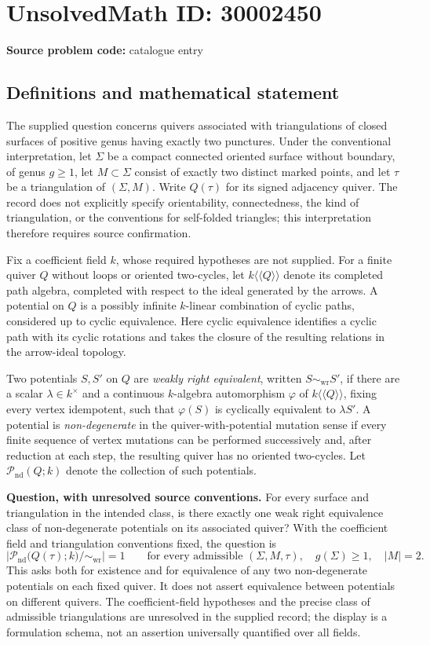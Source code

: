 \documentclass[11pt]{article}
\begin{document}
\section*{UnsolvedMath ID: 30002450}
\textbf{Source problem code:} catalogue entry
\subsection{Definitions and mathematical statement}
The supplied question concerns quivers associated with triangulations of closed surfaces of positive genus having exactly two punctures. Under the conventional interpretation, let \(\Sigma\) be a compact connected oriented surface without boundary, of genus \(g\geq 1\), let \(M\subset\Sigma\) consist of exactly two distinct marked points, and let \(\tau\) be a triangulation of \((\Sigma,M)\). Write \(Q(\tau)\) for its signed adjacency quiver. The record does not explicitly specify orientability, connectedness, the kind of triangulation, or the conventions for self-folded triangles; this interpretation therefore requires source confirmation.

Fix a coefficient field \(k\), whose required hypotheses are not supplied. For a finite quiver \(Q\) without loops or oriented two-cycles, let \(k\langle\!\langle Q\rangle\!\rangle\) denote its completed path algebra, completed with respect to the ideal generated by the arrows. A potential on \(Q\) is a possibly infinite \(k\)-linear combination of cyclic paths, considered up to cyclic equivalence. Here cyclic equivalence identifies a cyclic path with its cyclic rotations and takes the closure of the resulting relations in the arrow-ideal topology.

Two potentials \(S,S'\) on \(Q\) are \emph{weakly right equivalent}, written \(S\sim_{\mathrm{wr}}S'\), if there are a scalar \(\lambda\in k^{\times}\) and a continuous \(k\)-algebra automorphism \(\varphi\) of \(k\langle\!\langle Q\rangle\!\rangle\), fixing every vertex idempotent, such that \(\varphi(S)\) is cyclically equivalent to \(\lambda S'\). A potential is \emph{non-degenerate} in the quiver-with-potential mutation sense if every finite sequence of vertex mutations can be performed successively and, after reduction at each step, the resulting quiver has no oriented two-cycles. Let \(\mathcal P_{\mathrm{nd}}(Q;k)\) denote the collection of such potentials.

\textbf{Question, with unresolved source conventions.} For every surface and triangulation in the intended class, is there exactly one weak right equivalence class of non-degenerate potentials on its associated quiver? With the coefficient field and triangulation conventions fixed, the question is
\[
\left|\mathcal P_{\mathrm{nd}}\bigl(Q(\tau);k\bigr)/\!\sim_{\mathrm{wr}}\right|=1
\qquad\text{for every admissible }(\Sigma,M,\tau),\quad g(\Sigma)\geq 1,\quad |M|=2.
\]
This asks both for existence and for equivalence of any two non-degenerate potentials on each fixed quiver. It does not assert equivalence between potentials on different quivers. The coefficient-field hypotheses and the precise class of admissible triangulations are unresolved in the supplied record; the display is a formulation schema, not an assertion universally quantified over all fields.
\end{document}
